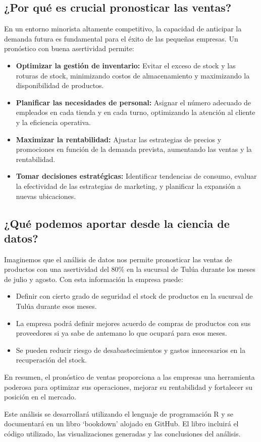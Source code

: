 \documentclass[
]{book}
\providecommand{\tightlist}{%
  \setlength{\itemsep}{0pt}\setlength{\parskip}{0pt}}
\begin{document}
\subsection{¿Por qué es crucial pronosticar las ventas?}\label{por-quuxe9-es-crucial-pronosticar-las-ventas}

En un entorno minorista altamente competitivo, la capacidad de anticipar la demanda futura es fundamental para el éxito de las pequeñas empresas. Un pronóstico con buena asertividad permite:

\begin{itemize}
\tightlist
\item
  \textbf{Optimizar la gestión de inventario:} Evitar el exceso de stock y las roturas de stock, minimizando costos de almacenamiento y maximizando la disponibilidad de productos.
\item
  \textbf{Planificar las necesidades de personal:} Asignar el número adecuado de empleados en cada tienda y en cada turno, optimizando la atención al cliente y la eficiencia operativa.
\item
  \textbf{Maximizar la rentabilidad:} Ajustar las estrategias de precios y promociones en función de la demanda prevista, aumentando las ventas y la rentabilidad.
\item
  \textbf{Tomar decisiones estratégicas:} Identificar tendencias de consumo, evaluar la efectividad de las estrategias de marketing, y planificar la expansión a nuevas ubicaciones.
\end{itemize}

\subsection{¿Qué podemos aportar desde la ciencia de datos?}\label{quuxe9-podemos-aportar-desde-la-ciencia-de-datos}

Imaginemos que el análisis de datos nos permite pronosticar las ventas de productos con una asertividad del 80\% en la sucursal de Tulúa durante los meses de julio y agosto. Con esta información la empresa puede:

\begin{itemize}
\tightlist
\item
  Definir con cierto grado de seguridad el stock de productos en la sucursal de Tulúa durante esos meses.
\item
  La empresa podrá definir mejores acuerdo de compras de productos con sus proveedores si ya sabe de antemano lo que ocupará para esos meses.
\item
  Se pueden reducir riesgo de desabastecimientos y gastos innecesarios en la recuperación del stock.
\end{itemize}

En resumen, el pronóstico de ventas proporciona a las empresas una herramienta poderosa para optimizar sus operaciones, mejorar su rentabilidad y fortalecer su posición en el mercado.

Este análisis se desarrollará utilizando el lenguaje de programación R y se documentará en un libro `bookdown' alojado en GitHub. El libro incluirá el código utilizado, las visualizaciones generadas y las conclusiones del análisis.

  
\end{document}
